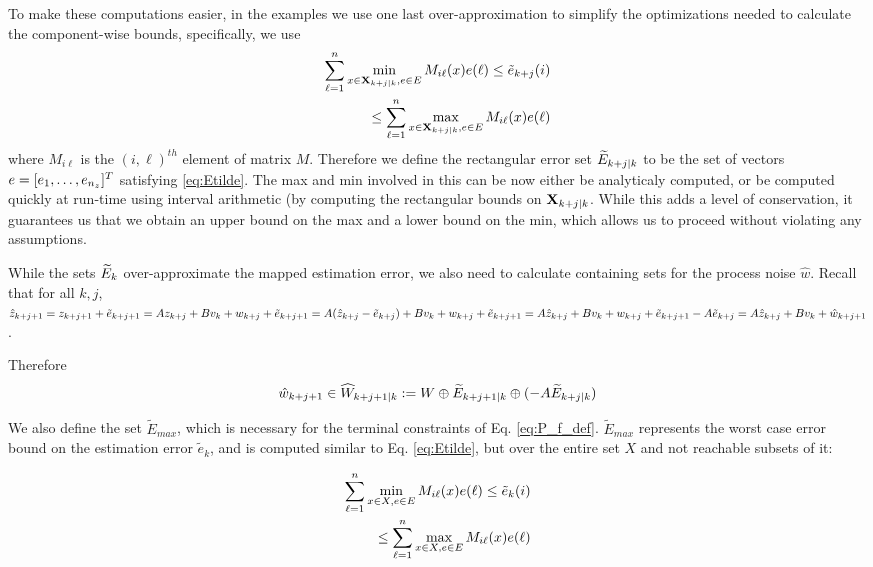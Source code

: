 To make these computations easier, in the examples we use one last over-approximation to simplify the optimizations needed to calculate the component-wise bounds, specifically, we use 
\begin{eqnarray}
\label{eq:Etilde}
\sum_{\ell=1}^{n} \min_{x \in \mathbf{X}_{k+j|k}, e \in E} M_{i\ell}(x)e(\ell)  \leq \tilde{e}_{k+j}(i) 
\nonumber 
\\
\leq \sum_{\ell=1}^{n} \max_{x \in \mathbf{X}_{k+j|k}, e \in E} M_{i\ell}(x)e(\ell)
\end{eqnarray}
where $M_{i\ell}$ is the $(i,\ell)^{th}$ element of matrix $M$.
Therefore we define the rectangular error set $\widetilde{E}_{k+j|k}$ to be the set of vectors $e = [e_1,\ldots, e_{n_z}]^T$ satisfying \eqref{eq:Etilde}. The max and min involved in this can be now either be analyticaly computed, or be computed quickly at run-time using interval arithmetic (by computing the rectangular bounds on $\mathbf{X}_{k+j|k}$. While this adds a level of conservation, it guarantees us that we obtain an upper bound on the max and a lower bound on the min, which allows us to proceed without violating any assumptions.

While the sets $\widetilde{E}_{k}$ over-approximate the mapped estimation error, we also need to calculate containing sets for the process noise $\hat{w}$.
Recall that for all $k,j$, 
$\hat{z}_{k+j+1} = z_{k+j+1} + \tilde{e}_{k+j+1} = Az_{k+j}+Bv_k+w_{k+j} + \tilde{e}_{k+j+1} =  A(\hat{z}_{k+j} - \tilde{e}_{k+j}) + Bv_k + w_{k+j} + \tilde{e}_{k+j+1} = A\hat{z}_{k+j} + Bv_k + w_{k+j} + \tilde{e}_{k+j+1} - A \tilde{e}_{k+j} = A\hat{z}_{k+j} + Bv_k + \hat{w}_{k+j+1}$.

Therefore 
\begin{equation}
\label{eq:What}
\hat{w}_{k+j+1} \in \widehat{W}_{k+j+1|k} := W \oplus \widetilde{E}_{k+j+1|k} \oplus(-A\widetilde{E}_{k+j|k})
\end{equation}

We also define the set $\tilde{E}_{max}$, which is necessary for the terminal constraints of Eq. \ref{eq:P_f_def}. $\tilde{E}_{max}$ represents the worst case error bound on the estimation error $\tilde{e}_k$, and is computed similar to Eq. \ref{eq:Etilde}, but over the entire set $X$ and not reachable subsets of it:

\begin{eqnarray}
\label{eq:EtildeMax}
\sum_{\ell=1}^{n} \min_{x \in X, e \in E} M_{i\ell}(x)e(\ell)  \leq \tilde{e}_{k}(i) 
\nonumber 
\\
\leq \sum_{\ell=1}^{n} \max_{x \in X, e \in E} M_{i\ell}(x)e(\ell)
\end{eqnarray}

